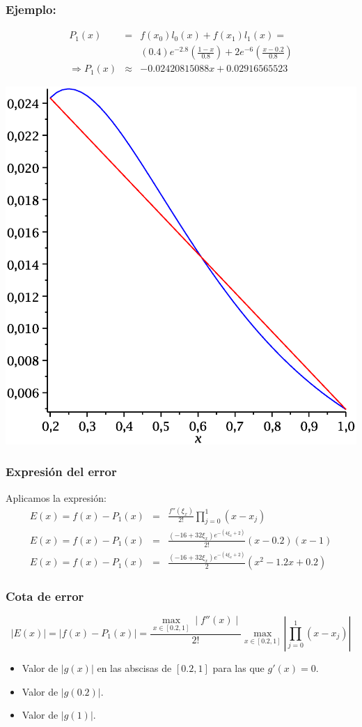 \documentclass{beamer}
\begin{document}
\frame
{
\frametitle{Ejemplo:}
\begin{eqnarray}
 P_1(x) & =& f(x_0)l_0(x) + f(x_1)l_1(x) = \nonumber\\
& &(0.4)e^{-2.8}\left(\frac{1-x}{0.8}\right) + 2e^{-6}\left(\frac{x-0.2}{0.8}\right)\nonumber\\
\Rightarrow P_1(x) &\approx& -0.02420815088x +0.02916565523\nonumber
\end{eqnarray}
\begin{center}
\includegraphics[scale=0.23]{approx.eps}
\end{center}
}
\frame
{
\frametitle{Expresi\'on del error}
Aplicamos la expresi\'on:
\begin{eqnarray}
 E(x)  =  f(x) - P_1(x) & = & \frac{f''(\xi_x)}{2!}\prod_{j=0}^1(x-x_j)\nonumber\\
E(x)  =  f(x) - P_1(x) & = & \frac{(-16+32\xi_x)e^{-(4\xi_x+2)}}{2!}(x-0.2)(x-1)\nonumber\\
E(x)  =  f(x) - P_1(x) & = & \frac{(-16+32\xi_x)e^{-(4\xi_x+2)}}{2}(x^2-1.2x+0.2)\nonumber
\end{eqnarray}
}
\frame
{
\frametitle{Cota de error}
$$
\mid E(x)\mid  =  \mid f(x) - P_1(x)\mid  =  \frac{\displaystyle\max_{x\in[0.2,1]}\mid f''(x)\mid}{2!}\displaystyle\max_{x\in[0.2,1]}\left|\prod_{j=0}^1(x-x_j)\right|
$$
\begin{itemize}
 \item<4-> Valor de $|g(x)|$ en las abscisas de $[0.2, 1]$ para las que $g'(x) = 0$.
 \item<5-> Valor de $|g(0.2)|$.
 \item<6-> Valor de $|g(1)|$.
\end{itemize}
}
\end{document}
